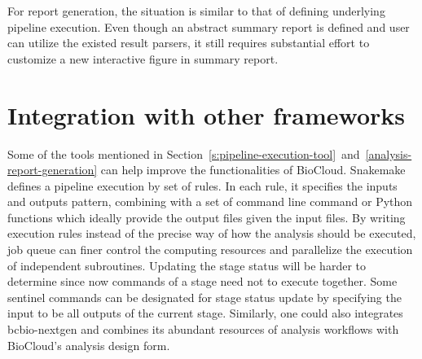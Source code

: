 For report generation, the situation is similar to that of defining underlying
pipeline execution. Even though an abstract summary report is defined and user
can utilize the existed result parsers, it still requires substantial effort to
customize a new interactive figure in summary report.




\section{Integration with other frameworks}

Some of the tools mentioned in
Section~\ref{s:pipeline-execution-tool}~and~\ref{analysis-report-generation}
can help improve the functionalities of BioCloud. Snakemake
\cite{koster2012:snakemakea} defines a pipeline execution by set of rules. In
each rule, it specifies the inputs and outputs pattern, combining with a set of
command line command or Python functions which ideally provide the output files
given the input files. By writing execution rules instead of the precise way of
how the analysis should be executed, job queue can finer control the computing
resources and parallelize the execution of independent subroutines. Updating
the stage status will be harder to determine since now commands of a stage need
not to execute together. Some sentinel commands can be designated for stage
status update by specifying the input to be all outputs of the current stage.
Similarly, one could also integrates bcbio-nextgen
\cite{:bcbionextgen,guimera2012:bcbionextgen} and combines its abundant
resources of analysis workflows with BioCloud's analysis design form.





